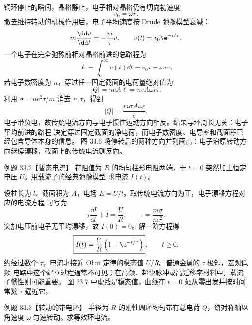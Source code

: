 \begin{xesolution}
铜环停止的瞬间，晶格静止，电子相对晶格仍有切向初速度
\[
  v_0=\omega r.
\]
撤去维持转动的机械作用后，电子平均速度按 Drude 弛豫模型衰减：
\[
  m\frac{\dd v}{\dd t}=-\frac m\tau v,
  \qquad v(t)=v_0\e^{-t/\tau}.
\]
一个电子在完全弛豫前相对晶格前进的总路程为
\[
  \ell=\int_0^\infty v(t)\dd t=v_0\tau=\omega r\tau.
\]
若电子数密度为 $n$，穿过任一固定截面的电荷量绝对值为
\[
  |Q|=neA\ell=neA\omega r\tau.
\]
利用 $\sigma=ne^2\tau/m$ 消去 $n,\tau$，得到
\begin{equation}
  \boxed{|Q|=\frac{m\sigma A\omega r}{e}}.
\end{equation}
电子带负电，故传统电流方向与电子惯性运动方向相反。结果与环周长无关：电子平均前进的路程
决定穿过固定截面的净电荷，而电子数密度、电导率和截面积已经包含导体本身的信息。
图 33.6 将停转后的两种方向并列画出：电子沿原转动方向继续漂移，截面上的传统电流则反向。

\tolmanDiagram
\end{xesolution}

\Needspace{0.34\textheight}
\begin{origexamplebox}{例题 33.2【暂态电流】}
在阻值为 $R$ 的均匀柱形电阻两端，于 $t=0$ 突然加上恒定电压 $U$。用载流子的经典弛豫模型
求电流 $I(t)$。
\end{origexamplebox}

\begin{xesolution}
设柱长为 $l$、截面积为 $A$，电场 $E=U/l$。取传统电流方向为正，电子漂移方程对应的电流方程
可写为
\begin{equation}
  \tau\frac{\dd I}{\dd t}+I=\frac UR,
  \qquad
  \tau=\frac{m\sigma}{ne^2}.
\end{equation}
突加电压前电子无平均漂移，故 $I(0)=0$。解一阶方程得
\begin{equation}
  \boxed{I(t)=\frac UR\left(1-\e^{-t/\tau}\right)},
  \qquad t\ge0.
\end{equation}
约经过数个 $\tau$，电流才接近 Ohm 定律的稳态值 $U/R$。普通金属的 $\tau$ 极短，宏观低频
电路中这个建立过程通常不可见；在高频、超快脉冲或高迁移率材料中，载流子惯性则可能重要。
图 33.7 中虚线是稳态值，曲线在 $t=0$ 处从零出发并按时间常数 $\tau$ 逼近它。

\transientCurrentDiagram
\end{xesolution}

\Needspace{0.3\textheight}
\begin{origexamplebox}{例题 33.3【转动的带电环】}
半径为 $R$ 的刚性圆环均匀带有总电荷 $Q$，绕对称轴以角速度 $\omega$ 匀速转动。求等效环电流。
\end{origexamplebox}

